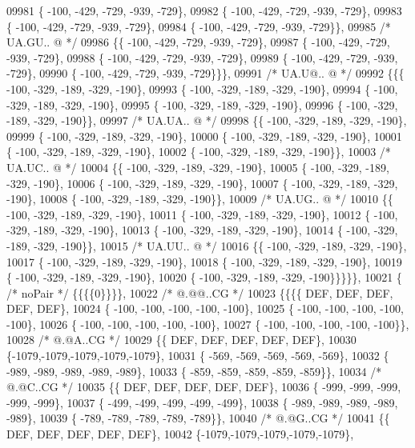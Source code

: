 \begin{DoxyCode}
09981 \{ -100, -429, -729, -939, -729\},
09982 \{ -100, -429, -729, -939, -729\},
09983 \{ -100, -429, -729, -939, -729\},
09984 \{ -100, -429, -729, -939, -729\}\},
09985 \textcolor{comment}{/* UA.GU.. @ */}
09986 \{\{ -100, -429, -729, -939, -729\},
09987 \{ -100, -429, -729, -939, -729\},
09988 \{ -100, -429, -729, -939, -729\},
09989 \{ -100, -429, -729, -939, -729\},
09990 \{ -100, -429, -729, -939, -729\}\}\},
09991 \textcolor{comment}{/* UA.U@.. @ */}
09992 \{\{\{ -100, -329, -189, -329, -190\},
09993 \{ -100, -329, -189, -329, -190\},
09994 \{ -100, -329, -189, -329, -190\},
09995 \{ -100, -329, -189, -329, -190\},
09996 \{ -100, -329, -189, -329, -190\}\},
09997 \textcolor{comment}{/* UA.UA.. @ */}
09998 \{\{ -100, -329, -189, -329, -190\},
09999 \{ -100, -329, -189, -329, -190\},
10000 \{ -100, -329, -189, -329, -190\},
10001 \{ -100, -329, -189, -329, -190\},
10002 \{ -100, -329, -189, -329, -190\}\},
10003 \textcolor{comment}{/* UA.UC.. @ */}
10004 \{\{ -100, -329, -189, -329, -190\},
10005 \{ -100, -329, -189, -329, -190\},
10006 \{ -100, -329, -189, -329, -190\},
10007 \{ -100, -329, -189, -329, -190\},
10008 \{ -100, -329, -189, -329, -190\}\},
10009 \textcolor{comment}{/* UA.UG.. @ */}
10010 \{\{ -100, -329, -189, -329, -190\},
10011 \{ -100, -329, -189, -329, -190\},
10012 \{ -100, -329, -189, -329, -190\},
10013 \{ -100, -329, -189, -329, -190\},
10014 \{ -100, -329, -189, -329, -190\}\},
10015 \textcolor{comment}{/* UA.UU.. @ */}
10016 \{\{ -100, -329, -189, -329, -190\},
10017 \{ -100, -329, -189, -329, -190\},
10018 \{ -100, -329, -189, -329, -190\},
10019 \{ -100, -329, -189, -329, -190\},
10020 \{ -100, -329, -189, -329, -190\}\}\}\}\},
10021 \{ \textcolor{comment}{/* noPair */} \{\{\{\{0\}\}\}\},
10022 \textcolor{comment}{/*  @.@@..CG */}
10023 \{\{\{\{  DEF,  DEF,  DEF,  DEF,  DEF\},
10024 \{ -100, -100, -100, -100, -100\},
10025 \{ -100, -100, -100, -100, -100\},
10026 \{ -100, -100, -100, -100, -100\},
10027 \{ -100, -100, -100, -100, -100\}\},
10028 \textcolor{comment}{/*  @.@A..CG */}
10029 \{\{  DEF,  DEF,  DEF,  DEF,  DEF\},
10030 \{-1079,-1079,-1079,-1079,-1079\},
10031 \{ -569, -569, -569, -569, -569\},
10032 \{ -989, -989, -989, -989, -989\},
10033 \{ -859, -859, -859, -859, -859\}\},
10034 \textcolor{comment}{/*  @.@C..CG */}
10035 \{\{  DEF,  DEF,  DEF,  DEF,  DEF\},
10036 \{ -999, -999, -999, -999, -999\},
10037 \{ -499, -499, -499, -499, -499\},
10038 \{ -989, -989, -989, -989, -989\},
10039 \{ -789, -789, -789, -789, -789\}\},
10040 \textcolor{comment}{/*  @.@G..CG */}
10041 \{\{  DEF,  DEF,  DEF,  DEF,  DEF\},
10042 \{-1079,-1079,-1079,-1079,-1079\},

\end{DoxyCode}
